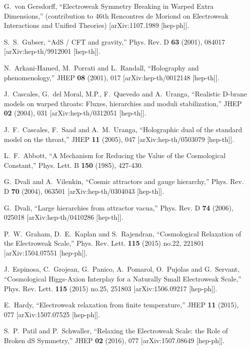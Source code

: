 \documentclass[12pt]{article}
\numberwithin{equation}{section}
\begin{document}
\begin{thebibliography}{999}
G.~von Gersdorff,
``Electroweak Symmetry Breaking in Warped Extra Dimensions,'' (contribution to 46th Rencontres de Moriond on Electroweak Interactions and Unified Theories) [arXiv:1107.1989 [hep-ph]].

S.~S.~Gubser, ``AdS / CFT and gravity,''
Phys. Rev. D \textbf{63} (2001), 084017 [arXiv:hep-th/9912001 [hep-th]].

N.~Arkani-Hamed, M.~Porrati and L.~Randall,
``Holography and phenomenology,''
JHEP \textbf{08} (2001), 017 [arXiv:hep-th/0012148 [hep-th]].

J.~Cascales, G.~del Moral, M.P., F.~Quevedo and A.~Uranga,
``Realistic D-brane models on warped throats: Fluxes, hierarchies and moduli stabilization,''
JHEP \textbf{02} (2004), 031 [arXiv:hep-th/0312051 [hep-th]].

J.~F.~Cascales, F.~Saad and A.~M.~Uranga,
``Holographic dual of the standard model on the throat,''
JHEP \textbf{11} (2005), 047 [arXiv:hep-th/0503079 [hep-th]].

L.~F.~Abbott,
``A Mechanism for Reducing the Value of the Cosmological Constant,''
Phys. Lett. B \textbf{150} (1985), 427-430.

G.~Dvali and A.~Vilenkin,
``Cosmic attractors and gauge hierarchy,''
Phys. Rev. D \textbf{70} (2004), 063501 [arXiv:hep-th/0304043 [hep-th]].

G.~Dvali, ``Large hierarchies from attractor vacua,''
Phys. Rev. D \textbf{74} (2006), 025018
[arXiv:hep-th/0410286 [hep-th]].

P.~W.~Graham, D.~E.~Kaplan and S.~Rajendran,
``Cosmological Relaxation of the Electroweak Scale,''
Phys. Rev. Lett. \textbf{115} (2015) no.22, 221801 [arXiv:1504.07551 [hep-ph]].

J.~Espinosa, C.~Grojean, G.~Panico, A.~Pomarol, O.~Pujolas and G.~Servant,
``Cosmological Higgs-Axion Interplay for a Naturally Small Electroweak Scale,''
Phys. Rev. Lett. \textbf{115} (2015) no.25, 251803 [arXiv:1506.09217 [hep-ph]].

E.~Hardy,
``Electroweak relaxation from finite temperature,''
JHEP \textbf{11} (2015), 077
[arXiv:1507.07525 [hep-ph]].

S.~P.~Patil and P.~Schwaller,
``Relaxing the Electroweak Scale: the Role of Broken dS Symmetry,''
JHEP \textbf{02} (2016), 077 [arXiv:1507.08649 [hep-ph]].


\end{thebibliography}
\end{document}
